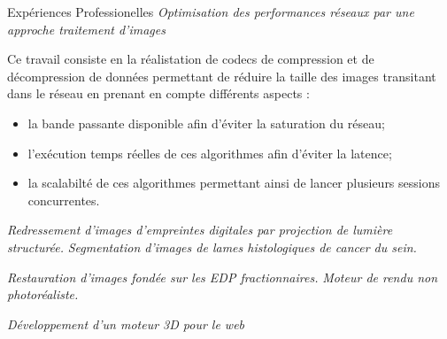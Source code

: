 \begin{rubric}{Expériences Professionelles}
\entry*[2011-]
\textit{Optimisation des performances réseaux par une approche traitement d'images}
\par Ce travail consiste en la réalistation de codecs de compression et de décompression de données
permettant de réduire la taille des images transitant dans le réseau en prenant en compte différents aspects :
\begin{itemize}
\item la bande passante disponible afin d'éviter la saturation du réseau;
\item l'exécution temps réelles de ces algorithmes afin d'éviter la latence;  
\item la scalabilté de ces algorithmes permettant ainsi de lancer plusieurs sessions concurrentes.
\end{itemize}

\entry*[2010-2011]
\textit{Redressement d'images d'empreintes digitales par projection de lumière structurée.}
\entry*[2009-2010]
\textit{Segmentation d'images de lames histologiques de cancer du sein.}
 
\entry*[03-09 2003] 
\textit{Restauration d'images fondée sur les EDP fractionnaires.}
\entry*[07-09 2002]
\textit{Moteur de rendu non photoréaliste.}

\entry*[06-11 2001]
\textit{Développement d'un moteur 3D pour le web}

\end{rubric}
